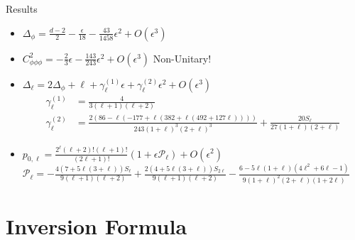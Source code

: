\documentclass[pdf]{beamer}
\begin{document}
                \begin{frame}[t]{Results}
                    \begin{itemize}
                        \item<2->$\Delta_{\phi} = \frac{d-2}{2} - \frac{\epsilon}{18} - \frac{43}{1458}\epsilon^2 + O(\epsilon^3)$
                        \item<3->$C_{\phi\phi\phi}^2 = -\frac{2}{3}\epsilon - \frac{143}{243}\epsilon^2 + O(\epsilon^3)$\hspace{20pt} Non-Unitary!
                        \item<4->$\Delta_{\ell} = 2\Delta_{\phi} + \ell + \gamma_{\ell}^{(1)}\epsilon + \gamma_{\ell}^{(2)}\epsilon^2 + O(\epsilon^3)$
                        \begin{align*}
                            \gamma_{\ell}^{(1)} &= \frac{4}{3(\ell+1)(\ell+2)}\\
                            \gamma_{\ell}^{(2)} &= \frac{2(86-\ell(-177+\ell(382+\ell(492+127\ell))))}{243(1+\ell)^3(2+\ell)^3}+ \frac{20S_\ell}{27(1+\ell)(2+\ell)}
                        \end{align*}
                    
                    
                        \item<6->$p_{0,\ell} = \frac{2^{\ell} (\ell+2)!(\ell+1)! }{(2\ell+1)!}(1+\epsilon\mathcal{P}_{\ell}) + O(\epsilon^2)$\\
                        \vspace{10pt}
                         $\mathcal{P}_{\ell} = -\frac{4(7+5\ell(3+\ell))S_{\ell}}{9(\ell+1)(\ell+2)} + \frac{2(4+5\ell(3+\ell))S_{2\ell}}{9(\ell+1)(\ell+2)}-\frac{6-5\ell(1+\ell)(4\ell^2+6\ell-1)}{9(1+\ell)^2(2+\ell)(1+2\ell)}$
                        
                    \end{itemize}
                \end{frame}

        \section{Inversion Formula}
                
\end{document}
